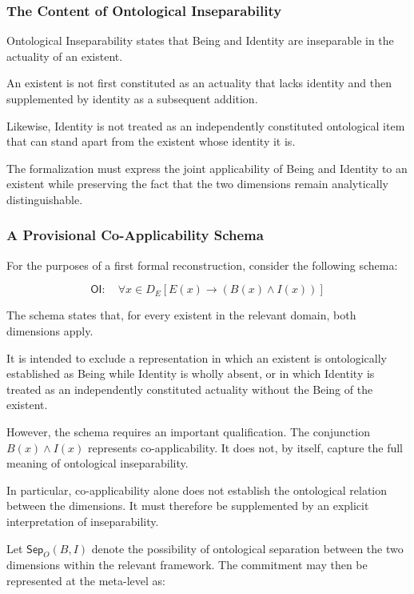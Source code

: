 \subsubsection{The Content of Ontological Inseparability}

Ontological Inseparability states that Being and
Identity are inseparable in the actuality of an
existent.

An existent is not first constituted as an actuality
that lacks identity and then supplemented by
identity as a subsequent addition.

Likewise, Identity is not treated as an independently
constituted ontological item that can stand apart
from the existent whose identity it is.

The formalization must express the joint applicability
of Being and Identity to an existent while preserving
the fact that the two dimensions remain analytically
distinguishable.

\subsubsection{A Provisional Co-Applicability Schema}

For the purposes of a first formal reconstruction,
consider the following schema:

\[
\mathsf{OI}:
\quad
\forall x \in D_E
\left[
E(x)
\rightarrow
\left(B(x)\land I(x)\right)
\right]
\]

The schema states that, for every existent in the
relevant domain, both dimensions apply.

It is intended to exclude a representation in which
an existent is ontologically established as Being
while Identity is wholly absent, or in which Identity
is treated as an independently constituted actuality
without the Being of the existent.

However, the schema requires an important qualification.
The conjunction \(B(x)\land I(x)\) represents
co-applicability. It does not, by itself, capture
the full meaning of ontological inseparability.

In particular, co-applicability alone does not
establish the ontological relation between the
dimensions. It must therefore be supplemented
by an explicit interpretation of inseparability.

Let \(\mathsf{Sep}_O(B,I)\) denote the possibility
of ontological separation between the two dimensions
within the relevant framework. The commitment may
then be represented at the meta-level as:


